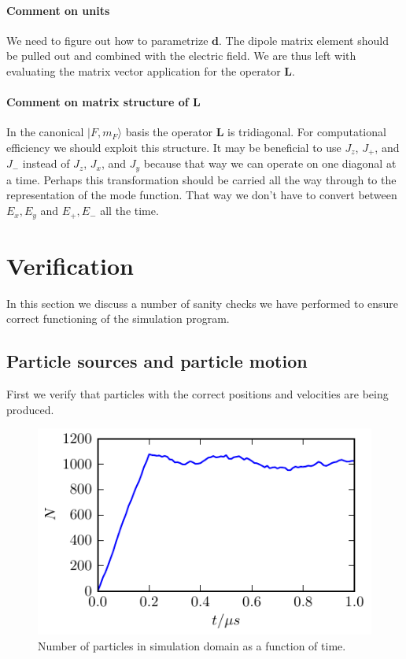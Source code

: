 \documentclass[aps, superscriptaddress, groupedaddress, preprint]{revtex4}
\renewcommand\vec{\mathbf}
\begin{document}
\paragraph{Comment on units} We need to figure out how to
parametrize $\vec{d}$.  The dipole matrix element should be
pulled out and combined with the electric field.  We are thus
left with evaluating the matrix vector application for the
operator $\vec{L}$.

\paragraph{Comment on matrix structure of $\vec{L}$} In the
canonical $|F,m_F\rangle$ basis the operator $\vec{L}$ is
tridiagonal.  For computational efficiency we should exploit this
structure.  It may be beneficial to use $J_z$, $J_+$, and $J_-$
instead of $J_z$, $J_x$, and $J_y$ because that way we can
operate on one diagonal at a time.  Perhaps this transformation
should be carried all the way through to the representation of
the mode function.  That way we don't have to convert between
$E_x,E_y$ and $E_+, E_-$ all the time.


\section{Verification}

In this section we discuss a number of sanity checks we have
performed to ensure correct functioning of the simulation
program.


\subsection{Particle sources and particle motion}

First we verify that particles with the correct positions and
velocities are being produced.

\begin{figure}
\begin{center}
\includegraphics{ptcl_source/numPtclsVsT.pdf}
\end{center}
\caption{Number of particles in simulation domain as a function
of time.}
\end{figure}
\end{document}
